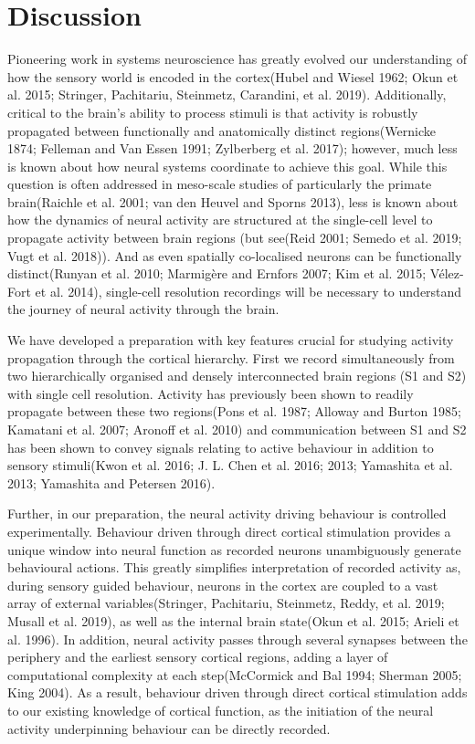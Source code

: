 \chapter{\label{discussion}Discussion}
Pioneering work in systems neuroscience has greatly evolved our understanding of how the sensory world is encoded in the cortex(Hubel and Wiesel 1962; Okun et al. 2015; Stringer, Pachitariu, Steinmetz, Carandini, et al. 2019). Additionally, critical to the brain’s ability to process stimuli is that activity is robustly propagated between functionally and anatomically distinct regions(Wernicke 1874; Felleman and Van Essen 1991; Zylberberg et al. 2017); however, much less is known about how neural systems coordinate to achieve this goal. While this question is often addressed in meso-scale studies of particularly the primate brain(Raichle et al. 2001; van den Heuvel and Sporns 2013), less is known about how the dynamics of neural activity are structured at the single-cell level to propagate activity between brain regions (but see(Reid 2001; Semedo et al. 2019; Vugt et al. 2018)). And as even spatially co-localised neurons can be functionally distinct(Runyan et al. 2010; Marmigère and Ernfors 2007; Kim et al. 2015; Vélez-Fort et al. 2014), single-cell resolution recordings will be necessary to understand the journey of neural activity through the brain.

We have developed a preparation with key features crucial for studying activity propagation through the cortical hierarchy. First we record simultaneously from two hierarchically organised and densely interconnected brain regions (S1 and S2) with single cell resolution. Activity has previously been shown to readily propagate between these two regions(Pons et al. 1987; Alloway and Burton 1985; Kamatani et al. 2007; Aronoff et al. 2010) and communication between S1 and S2 has been shown to convey signals relating to active behaviour in addition to sensory stimuli(Kwon et al. 2016; J. L. Chen et al. 2016; 2013; Yamashita et al. 2013; Yamashita and Petersen 2016). 

Further, in our preparation, the neural activity driving behaviour is controlled experimentally. Behaviour driven through direct cortical stimulation provides a unique window into neural function as recorded neurons unambiguously generate behavioural actions. This greatly simplifies interpretation of recorded activity as, during sensory guided behaviour, neurons in the cortex are coupled to a vast array of external variables(Stringer, Pachitariu, Steinmetz, Reddy, et al. 2019; Musall et al. 2019), as well as the internal brain state(Okun et al. 2015; Arieli et al. 1996). In addition, neural activity passes through several synapses between the periphery and the earliest sensory cortical regions, adding a layer of computational complexity at each step(McCormick and Bal 1994; Sherman 2005; King 2004). As a result, behaviour driven through direct cortical stimulation adds to our existing knowledge of cortical function, as the initiation of the neural activity underpinning behaviour can be directly recorded.

